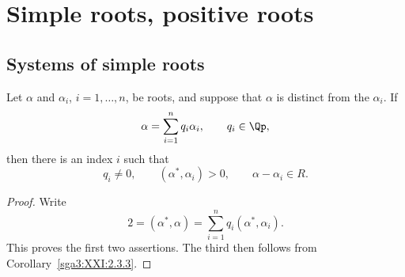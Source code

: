 \section{Simple roots, positive roots}

\subsection{Systems of simple roots}

\begin{lemma}\label{sga3:XXI:3.1.1}
Let \(\alpha\) and \(\alpha_i\), \(i=1,\ldots,n\), be roots, and
suppose that \(\alpha\) is distinct from the \(\alpha_i\). If
\[
 \alpha=\sum_{i=1}^n q_i\alpha_i,
 \qquad q_i\in\Qp,
\]
then there is an index \(i\) such that
\[
 q_i\neq0,\qquad(\alpha^\ast,\alpha_i)>0,\qquad
 \alpha-\alpha_i\in R.
\]
\end{lemma}

\begin{proof}
Write
\[
 2=(\alpha^\ast,\alpha)
   =\sum_{i=1}^n q_i(\alpha^\ast,\alpha_i).
\]
This proves the first two assertions. The third then follows from
Corollary~\ref{sga3:XXI:2.3.3}.
\end{proof}
